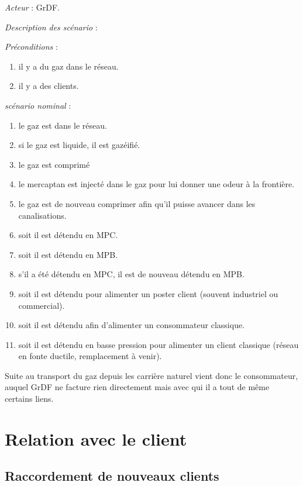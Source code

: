 \documentclass[
12pt,
french,                           %
a4paper,
]{article}
\begin{document}
\emph{Acteur} : GrDF.

\emph{Description des scénario} :

\emph{Préconditions} :

\begin{enumerate}[1.]
\item
  il y a du gaz dans le réseau.
\item
  il y a des clients.
\end{enumerate}

\emph{scénario nominal} :

\begin{enumerate}[1.]
\item
  le gaz est dans le réseau.
\item
  si le gaz est liquide, il est gazéifié.
\item
  le gaz est comprimé
\item
  le mercaptan est injecté dans le gaz pour lui donner une odeur à la
  frontière.
\item
  le gaz est de nouveau comprimer afin qu'il puisse avancer dans les
  canalisations.
\item
  soit il est détendu en MPC.
\item
  soit il est détendu en MPB.
\item
  s'il a été détendu en MPC, il est de nouveau détendu en MPB.
\item
  soit il est détendu pour alimenter un poster client (souvent
  industriel ou commercial).
\item
  soit il est détendu afin d'alimenter un consommateur classique.
\item
  soit il est détendu en basse pression pour alimenter un client
  classique (réseau en fonte ductile, remplacement à venir).
\end{enumerate}

Suite au transport du gaz depuis les carrière naturel vient donc le
consommateur, auquel GrDF ne facture rien directement mais avec qui il a
tout de même certains liens.

\section{Relation avec le client}

\subsection{Raccordement de nouveaux clients}
\end{document}
